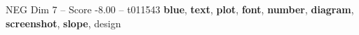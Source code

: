 \begin{textsample}{NEG Dim 7 – Score -8.00 – t011543}  \label{ex:f7_neg_010}
\textbf{blue}, \textbf{text}, \textbf{plot}, \textbf{font}, \textbf{number}, \textbf{diagram}, \textbf{screenshot}, \textbf{slope}, design

\end{textsample}
